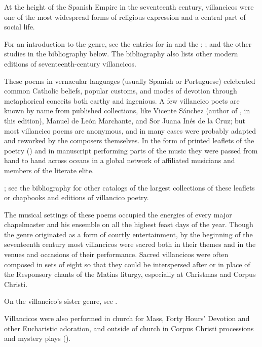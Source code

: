 At the height of the Spanish Empire in the seventeenth century,
villancicos were one of the most widespread forms of religious expression and a 
central part of social life.%
  \begin{Footnote}
      For an introduction to the genre, see the entries for  in 
       and the ; \autocites{Laird:VC}{Knighton-Torrente:VCs};
      and the other studies in the bibliography below.
      The bibliography also lists other modern editions of seventeenth-century
      villancicos.  
  \end{Footnote}
These poems in vernacular languages (usually Spanish or Portuguese) celebrated 
common Catholic beliefs, popular customs, and modes of devotion through 
metaphorical conceits both earthy and ingenious.
A few villancico poets are known by name from published collections, like
Vicente Sánchez (author of , in this edition),
Manuel de León Marchante, and Sor Juana Inés de la Cruz; but most villancico
poems are anonymous, and in many cases were probably adapted and reworked by the
composers themselves.
In the form of printed leaflets of the poetry () and in 
manuscript performing parts of the music they were passed from hand to hand 
across oceans in a global network of affiliated musicians and members of the 
literate elite.%
  \begin{Footnote}
      \Autocite{BNE:VCs17C}; see the bibliography for other catalogs of the
      largest collections of these leaflets or chapbooks and editions of
      villancico poetry.
  \end{Footnote}

The musical settings of these poems occupied the energies of every major 
chapelmaster and his ensemble on all the highest feast days of the year.
Though the genre originated as a form of courtly entertainment, by the 
beginning of the seventeenth century most villancicos were sacred both in their 
themes and in the venues and occasions of their performance.
Sacred villancicos were often composed in sets of eight so that they could be 
interspersed after or in place of the Responsory chants of the Matins liturgy, 
especially at Christmas and Corpus Christi.%
    \begin{Footnote}
        On the villancico's sister genre, see \autocite{Goldman:Responsory}.
    \end{Footnote}
Villancicos were also performed in church for Mass, Forty Hours' Devotion and 
other Eucharistic adoration, and outside of church in Corpus Christi 
processions and mystery plays ().

